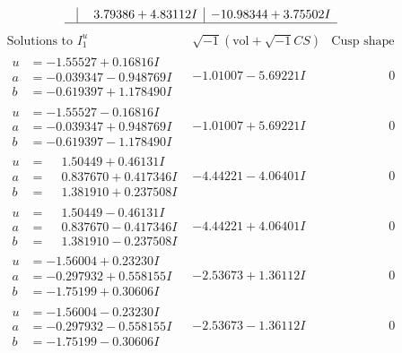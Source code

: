 \documentclass[1p]{elsarticle_modified}
\theoremstyle{definition}
\newcommand{\I}{\sqrt{-1}}
\begin{document}
$$\begin{array}{c|c|c}
 & \phantom{-}3.79386 + 4.83112 I & -10.98344 + 3.75502 I\\
 \hline 
 \end{array}$$\newpage$$\begin{array}{c|c|c}  
\text{Solutions to }I^u_{1}& \I (\text{vol} + \sqrt{-1}CS) & \text{Cusp shape}\\
 \hline 
\begin{aligned}
u &= -1.55527 + 0.16816 I \\
a &= -0.039347 - 0.948769 I \\
b &= -0.619397 + 1.178490 I\end{aligned}
 & -1.01007 - 5.69221 I & \phantom{-0.000000 } 0 \\ \hline\begin{aligned}
u &= -1.55527 - 0.16816 I \\
a &= -0.039347 + 0.948769 I \\
b &= -0.619397 - 1.178490 I\end{aligned}
 & -1.01007 + 5.69221 I & \phantom{-0.000000 } 0 \\ \hline\begin{aligned}
u &= \phantom{-}1.50449 + 0.46131 I \\
a &= \phantom{-}0.837670 + 0.417346 I \\
b &= \phantom{-}1.381910 + 0.237508 I\end{aligned}
 & -4.44221 - 4.06401 I & \phantom{-0.000000 } 0 \\ \hline\begin{aligned}
u &= \phantom{-}1.50449 - 0.46131 I \\
a &= \phantom{-}0.837670 - 0.417346 I \\
b &= \phantom{-}1.381910 - 0.237508 I\end{aligned}
 & -4.44221 + 4.06401 I & \phantom{-0.000000 } 0 \\ \hline\begin{aligned}
u &= -1.56004 + 0.23230 I \\
a &= -0.297932 + 0.558155 I \\
b &= -1.75199 + 0.30606 I\end{aligned}
 & -2.53673 + 1.36112 I & \phantom{-0.000000 } 0 \\ \hline\begin{aligned}
u &= -1.56004 - 0.23230 I \\
a &= -0.297932 - 0.558155 I \\
b &= -1.75199 - 0.30606 I\end{aligned}
 & -2.53673 - 1.36112 I & \phantom{-0.000000 } 0 \\ \hline\begin{aligned}

\end{aligned}
\end{array}$$
\end{document}

